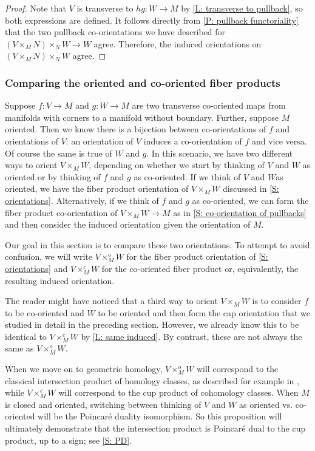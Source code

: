 \begin{proof}
	Note that $V$ is transverse to $hg \colon W \to M$ by \cref{L: transverse to pullback}, so both expressions are defined.
	It follows directly from \cref{P: pullback functoriality} that the two pullback co-orientations we have described for $(V \times_M N) \times_N W \to W$ agree.
	Therefore, the induced orientations on $(V \times_M N) \times_N W$ agree.
\end{proof}

\subsubsection{Comparing the oriented and co-oriented fiber products}

Suppose $f \colon V \to M$ and $g \colon W \to M$ are two transverse co-oriented maps from manifolds with corners to a manifold without boundary.
Further, suppose $M$ oriented.
Then we know there is a bijection between co-orientations of $f$ and orientations of $V$: an orientation of $V$ induces a co-orientation of $f$ and vice versa.
Of course the same is true of $W$ and $g$.
In this scenario, we have two different ways to orient $V \times_M W$, depending on whether we start by thinking of $V$ and $W$ as oriented or by thinking of $f$ and $g$ as co-oriented.
If we think of $V$ and $W $as oriented, we have the fiber product orientation of $V \times_M W$
discussed in \cref{S: orientations}.
Alternatively, if we think of $f$ and $g$ as co-oriented, we can form the fiber product co-orientation of $V \times_M W \to M$ as in \cref{S: co-orientation of pullbacks} and then consider the induced orientation given the orientation of $M$.

Our goal in this section is to compare these two orientations.
To attempt to avoid confusion, we will write $V \times_M ^oW$ for the fiber product orientation of \cref{S: orientations} and $V \times_M ^cW$ for the co-oriented fiber product or, equivalently, the resulting induced orientation.

The reader might have noticed that a third way to orient $V \times_M W$ is to consider $f$ to be co-oriented and $W$ to be oriented and then form the cap orientation that we studied in detail in the preceding section.
However, we already know this to be identical to $V \times_M ^cW$ by \cref{L: same induced}.
By contrast, these are not always the same as $V \times_M ^oW$.

When we move on to geometric homology, $V \times_M ^oW$ will correspond to the classical intersection product of homology classes, as described for example in \cite[Section VI.11]{Bred97}, while $V \times_M ^cW$ will correspond to the cup product of cohomology classes.
When $M$ is closed and oriented, switching between thinking of $V$ and $W$ as oriented vs. co-oriented will be the Poincar\'e duality isomorphism.
So this proposition will ultimately demonstrate that the intersection product is Poincar\'e dual to the cup product, up to a sign; see \cref{S: PD}.

